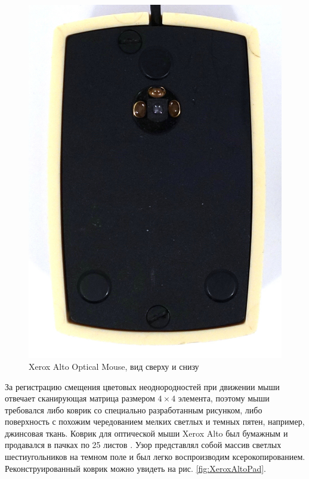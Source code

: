 \documentclass[11pt, a4paper]{article}
\begin{document}
\begin{figure}[h]
    \includegraphics[scale=0.5]{1981_xerox_alto_mouse/bottom_30.jpg}
    \caption{Xerox Alto Optical Mouse, вид сверху и снизу}
    \label{XeroxAltoTopAndBottom}
\end{figure}

За регистрацию смещения цветовых неоднородностей при движении мыши отвечает сканирующая матрица размером $4 \times 4$ элемента, поэтому мыши требовался либо коврик со специально разработанным рисунком, либо поверхность с похожим чередованием мелких светлых и темных пятен, например, джинсовая ткань. Коврик для оптической мыши Xerox Alto был бумажным и продавался в пачках по 25 листов \cite{pad}. Узор представлял собой массив светлых шестиугольников на темном поле и был легко воспроизводим ксерокопированием. Реконструированный коврик можно увидеть на рис. \ref{fig:XeroxAltoPad}.
\end{document}
